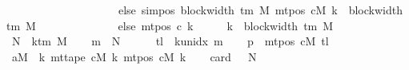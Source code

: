\begin{isabellebody}
\ \ \ \ \ \ \ \ \ \ \ \ \ \ \ \ \ \ \ \ else\ sim{\isacharunderscore}{\kern0pt}pos\ {\isacharparenleft}{\kern0pt}block{\isacharunderscore}{\kern0pt}width\ {\isacharparenleft}{\kern0pt}{\isasymGamma}{\isacharunderscore}{\kern0pt}tm\ M{\isacharparenright}{\kern0pt}{\isacharparenright}{\kern0pt}\ {\isacharparenleft}{\kern0pt}mt{\isacharunderscore}{\kern0pt}pos\ cM\ k{\isacharparenright}{\kern0pt}\ {\isacharplus}{\kern0pt}\ block{\isacharunderscore}{\kern0pt}width\ {\isacharparenleft}{\kern0pt}{\isasymGamma}{\isacharunderscore}{\kern0pt}tm\ M{\isacharparenright}{\kern0pt}{\isacharparenright}{\kern0pt}\isanewline
\ \ \ \ \ \ \ \ \ \ \ \ \ \ else\ mt{\isacharunderscore}{\kern0pt}pos\ c{}\ k{\isacharparenright}{\kern0pt}{\isachardoublequoteclose}\isanewline
%
\isadelimproof
%
\endisadelimproof
%
\isatagproof
{}\isamarkupfalse%
\ {\isacharminus}{\kern0pt}\isanewline
\ \ \isamarkupfalse%
\ {\isacharquery}{\kern0pt}k\ {\isacharequal}{\kern0pt}\ {\isachardoublequoteopen}block{\isacharunderscore}{\kern0pt}width\ {\isacharparenleft}{\kern0pt}{\isasymGamma}{\isacharunderscore}{\kern0pt}tm\ M{\isacharparenright}{\kern0pt}{\isachardoublequoteclose}\isanewline
\ \ \isamarkupfalse%
\ {\isacharquery}{\kern0pt}N\ {\isacharequal}{\kern0pt}\ {\isachardoublequoteopen}k{\isacharunderscore}{\kern0pt}tm\ M{\isachardoublequoteclose}\isanewline
\ \ \isamarkupfalse%
\ {\isacharquery}{\kern0pt}m{}\ {\isacharequal}{\kern0pt}\ {\isachardoublequoteopen}{\isacharquery}{\kern0pt}N\ {\isacharminus}{\kern0pt}\ {}{\isachardoublequoteclose}\isanewline
\ \ \isamarkupfalse%
\ {\isacharquery}{\kern0pt}tl\ {\isacharequal}{\kern0pt}\ {\isachardoublequoteopen}k{\isacharunderscore}{\kern0pt}unidx\ {\isacharquery}{\kern0pt}m{}{\isachardoublequoteclose}\isanewline
\ \ \isamarkupfalse%
\ {\isacharquery}{\kern0pt}p\ {\isacharequal}{\kern0pt}\ {\isachardoublequoteopen}mt{\isacharunderscore}{\kern0pt}pos\ cM\ {\isacharquery}{\kern0pt}tl{\isachardoublequoteclose}\isanewline
\ \ \isamarkupfalse%
\ {\isacharquery}{\kern0pt}aM\ {\isacharequal}{\kern0pt}\ {\isachardoublequoteopen}{\isasymlambda}k{\isachardot}{\kern0pt}\ mt{\isacharunderscore}{\kern0pt}tape\ cM\ k\ {\isacharparenleft}{\kern0pt}mt{\isacharunderscore}{\kern0pt}pos\ cM\ k{\isacharparenright}{\kern0pt}{\isachardoublequoteclose}\isanewline
\ \ \isamarkupfalse%
\ card{}{\isacharcolon}{\kern0pt}\ {\isachardoublequoteopen}{}\ {\isacharless}{\kern0pt}\ {\isacharquery}{\kern0pt}N{\isachardoublequoteclose}\ \isamarkupfalse%

\end{isabellebody}
